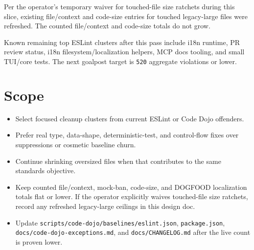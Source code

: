Per the operator's temporary waiver for touched-file size ratchets during this slice, existing file/context and code-size entries for touched legacy-large files were refreshed. The counted file/context and code-size totals do not grow.

Known remaining top ESLint clusters after this pass include i18n runtime, PR review status, i18n filesystem/localization helpers, MCP docs tooling, and small TUI/core tests. The next goalpost target is \texttt{5\allowbreak{}2\allowbreak{}0} aggregate violations or lower.

\section{Scope}\label{record-238-scope}

\begin{itemize}
\tightlist
\item
  Select focused cleanup clusters from current ESLint or Code Dojo offenders.
\item
  Prefer real type, data-shape, deterministic-test, and control-flow fixes over suppressions or cosmetic baseline churn.
\item
  Continue shrinking oversized files when that contributes to the same standards objective.
\item
  Keep counted file/context, mock-ban, code-size, and DOGFOOD localization totals flat or lower. If the operator explicitly waives touched-file size ratchets, record any refreshed legacy-large ceilings in this design doc.
\item
  Update \texttt{s\allowbreak{}c\allowbreak{}r\allowbreak{}i\allowbreak{}p\allowbreak{}t\allowbreak{}s\allowbreak{}/\allowbreak{}c\allowbreak{}o\allowbreak{}d\allowbreak{}e\allowbreak{}-\allowbreak{}d\allowbreak{}o\allowbreak{}j\allowbreak{}o\allowbreak{}/\allowbreak{}b\allowbreak{}a\allowbreak{}s\allowbreak{}e\allowbreak{}l\allowbreak{}i\allowbreak{}n\allowbreak{}e\allowbreak{}s\allowbreak{}/\allowbreak{}e\allowbreak{}s\allowbreak{}l\allowbreak{}i\allowbreak{}n\allowbreak{}t\allowbreak{}.\allowbreak{}j\allowbreak{}s\allowbreak{}o\allowbreak{}n}, \texttt{p\allowbreak{}a\allowbreak{}c\allowbreak{}k\allowbreak{}a\allowbreak{}g\allowbreak{}e\allowbreak{}.\allowbreak{}j\allowbreak{}s\allowbreak{}o\allowbreak{}n}, \texttt{d\allowbreak{}o\allowbreak{}c\allowbreak{}s\allowbreak{}/\allowbreak{}c\allowbreak{}o\allowbreak{}d\allowbreak{}e\allowbreak{}-\allowbreak{}d\allowbreak{}o\allowbreak{}j\allowbreak{}o\allowbreak{}-\allowbreak{}e\allowbreak{}x\allowbreak{}c\allowbreak{}e\allowbreak{}p\allowbreak{}t\allowbreak{}i\allowbreak{}o\allowbreak{}n\allowbreak{}s\allowbreak{}.\allowbreak{}m\allowbreak{}d}, and \texttt{d\allowbreak{}o\allowbreak{}c\allowbreak{}s\allowbreak{}/\allowbreak{}C\allowbreak{}H\allowbreak{}A\allowbreak{}N\allowbreak{}G\allowbreak{}E\allowbreak{}L\allowbreak{}O\allowbreak{}G\allowbreak{}.\allowbreak{}m\allowbreak{}d} after the live count is proven lower.
\end{itemize}

